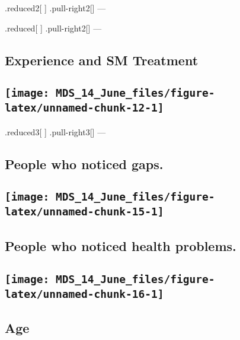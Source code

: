 \documentclass[
]{article}
\begin{document}
.reduced2{[} {]} .pull-right2{[}{]} ---

.reduced{[} {]} .pull-right2{[}{]} ---

\hypertarget{experience-and-sm-treatment}{%
\subsection{Experience and SM
Treatment}\label{experience-and-sm-treatment}}

\hypertarget{section-1}{%
\subsection{\texorpdfstring{\texttt{[image: MDS\_14\_June\_files/figure-latex/unnamed-chunk-12-1]}}{}}\label{section-1}}

.reduced3{[} {]} .pull-right3{[}{]} ---

\hypertarget{people-who-noticed-gaps.}{%
\subsection{People who noticed gaps.}\label{people-who-noticed-gaps.}}

\hypertarget{section-2}{%
\subsection{\texorpdfstring{\texttt{[image: MDS\_14\_June\_files/figure-latex/unnamed-chunk-15-1]}}{}}\label{section-2}}

\hypertarget{people-who-noticed-health-problems.}{%
\subsection{People who noticed health
problems.}\label{people-who-noticed-health-problems.}}

\hypertarget{section-3}{%
\subsection{\texorpdfstring{\texttt{[image: MDS\_14\_June\_files/figure-latex/unnamed-chunk-16-1]}}{}}\label{section-3}}

\hypertarget{age}{%
\subsection{Age}\label{age}}
\end{document}
